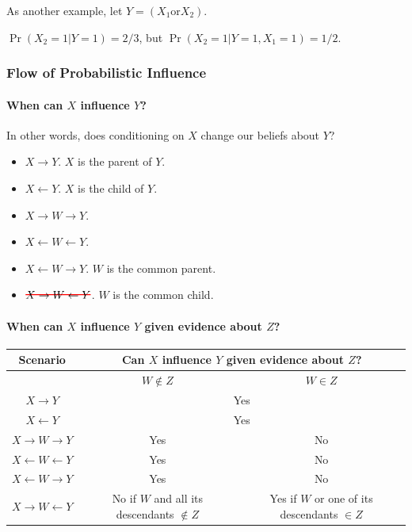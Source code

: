 \documentclass[12pt]{article}
\newcommand\hcancel[2][black]{\setbox0=\hbox{$#2$}
\rlap{\raisebox{.45\ht0}{\textcolor{#1}{\rule{\wd0}{1pt}}}}#2}
\begin{document}
As another example, let $Y = (X_1 \text{or} X_2)$.

$\Pr(X_2 = 1 | Y = 1) = 2/3$, but $\Pr(X_2 = 1 | Y = 1, X_1 = 1) = 1/2$.


\subsubsection{Flow of Probabilistic Influence}
\paragraph{When can $X$ influence $Y$?} In other words, does conditioning on $X$ change our beliefs about $Y$?

\begin{itemize}
  \item $X \rightarrow Y$. $X$ is the parent of $Y$.

  \item $X \leftarrow Y$. $X$ is the child of $Y$.

  \item $X \rightarrow W \rightarrow Y$.

  \item $X \leftarrow W \leftarrow Y$.

  \item $X \leftarrow W \rightarrow Y$. $W$ is the common parent.

  \item $\hcancel[red]{X \rightarrow W \leftarrow Y}$. $W$ is the common child.

\end{itemize}

\paragraph{When can $X$ influence $Y$ given evidence about $Z$?}

\begin{center}
\begin{tabular}{|c|c|c|}
    \hline
    Scenario & \multicolumn{2}{|c|}{Can $X$ influence $Y$ given evidence about $Z$?} \\ \hline
     & $W \not\in Z$ & $W \in Z$  \\ \hline

    $X \rightarrow Y$ & \multicolumn{2}{|c|}{Yes} \\

    $X \leftarrow Y$ & \multicolumn{2}{|c|}{Yes} \\

    $X \rightarrow W \rightarrow Y$ & Yes & No \\

    $X \leftarrow W \leftarrow Y$ & Yes & No \\

    $X \leftarrow W \rightarrow Y$ & Yes & No \\

    $X \rightarrow W \leftarrow Y$ & No if $W$ and all its descendants $\not\in Z$ & Yes if $W$ or one of its descendants $\in Z$\\
    \hline
  \end{tabular}
\end{center}
\end{document}
